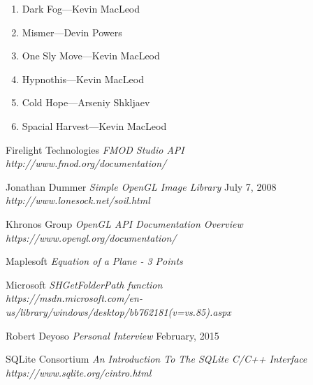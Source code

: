\documentclass{article}
\begin{document}
\begin{enumerate}
	\item Dark Fog---Kevin MacLeod
	\item Mismer---Devin Powers
	\item One Sly Move---Kevin MacLeod
	\item Hypnothis---Kevin MacLeod
	\item Cold Hope---Arseniy Shkljaev
	\item Spacial Harvest---Kevin MacLeod
\end{enumerate}

\pagebreak
\begin{thebibliography}{9}

Firelight Technologies 
\textit{FMOD Studio API} \\
\textit{http://www.fmod.org/documentation/}

Jonathan Dummer
\textit{Simple OpenGL Image Library} July 7, 2008 \\
\textit{http://www.lonesock.net/soil.html}
	
Khronos Group
\textit{OpenGL API Documentation Overview} \\
\textit{https://www.opengl.org/documentation/}

Maplesoft
\textit{Equation of a Plane - 3 Points}

Microsoft
\textit{SHGetFolderPath function} \\
\textit{https://msdn.microsoft.com/en-us/library/windows/desktop/bb762181(v=vs.85).aspx}

Robert Deyoso
\textit{Personal Interview} February, 2015

SQLite Consortium
\textit{An Introduction To The SQLite C/C++ Interface} \\
\textit{https://www.sqlite.org/cintro.html}

\end{thebibliography}
\end{document}
